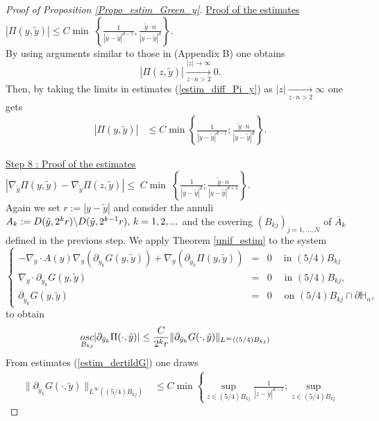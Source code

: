 \documentclass[11pt, reqno]{amsart}
\theoremstyle{definition}
\theoremstyle{remark}
\numberwithin{equation}{section}
\newcommand{\bs}{\symbol{92}}
\begin{document}
\begin{appendices}
\begin{proof}[Proof of \textup{Proposition \ref{Propo_estim_Green_y}}]
		\noindent \underline{Proof of the estimates} \,  $ | \Pi(y,\tilde{y})| \leq C \min \;\left\{\frac{1 }{|y-\tilde{y}|^{d-1}}  ,\frac{\tilde{y}\cdot n }{|y-\tilde{y}|^{d}}   \right\} .$\\
By using arguments similar to those in  \cite{HigPrZhuge} (Appendix B) one obtains 
	$$ |\Pi(z,\tilde{y})|\xrightarrow[z\cdot n>2]{|z|\rightarrow\infty}0.$$ 
Then, by taking the limits in estimates (\ref{estim_diff_Pi_y}) as $|z|\xrightarrow[z\cdot n>2]{}\infty$ one gets
		\begin{align*}
			| \Pi(y,\tilde{y}) | 
			&\leq  C 	\min \left\{  \frac{1 }{ |y-\tilde{y}|^{d-1}  };	\frac{\tilde{y}\cdot n}{|y-\tilde{y}|^{d}  }\right\}.
		\end{align*}
		
		
		\noindent \underline{Step 8 : Proof of the estimates} \,  $	|\nabla_{\tilde{y}} \Pi(y,\tilde{y}) - \nabla_{\tilde{y}} \Pi(z,\tilde{y})|\leq \;C \min \;\left\{\frac{ 1}{|y-\tilde{y}|^{d}}; \frac{\tilde{y}\cdot n }{|y-\tilde{y}|^{d+1}}   \right\} .$\\	
		Again we set $r:=|y-\tilde{y}|$ and consider the annuli $A_k:=D(\tilde{y}, 2^kr)\bs D(\tilde{y},2^{k-1}r),\, k=1,2, ...$ 
		and the covering $(B_{kj})_{j=1,...,N}$ of $\overline{A}_k$ defined in the previous step. We apply Theorem \ref{unif_estim} to the system  
		\begin{equation}
			\left\{
			\begin{array}{rcll}
				-\nabla_y\cdot A(y) \nabla_y ( \partial_{\tilde{y}_k}G(y,\tilde{y}) )  +  \nabla_y  ( \partial_{\tilde{y}_k} \Pi(y,\tilde{y}) ) &=& 0 \   \quad \mbox{in }  (5/4) B_{kj}\\
				\nabla_y\cdot  \partial_{\tilde{y}_k}G(y,\tilde{y})&=& 0 \;   \quad  \mbox{in }  (5/4) B_{kj} ,\\
				\partial_{\tilde{y}_k}G(y,\tilde{y}) &=& 0 \; \quad  \mbox{on }  (5/4)	B_{kj}\cap \partial\mathbb{H}_n,
			\end{array}
			\right. 
		\end{equation}
		to obtain 
		\begin{align}
			\underset{B_{kj}}{\textup{osc}}	| \partial_{\tilde{y}_k} \Pi(\cdot,\tilde{y})|
			&\leq  \frac{C}{2^kr}  \|\partial_{\tilde{y}_k}G(\cdot,\tilde{y})\|_{L^{\infty}((5/4)B_{kj})}\label{estim_Linf_Bkj_der_Pi}
		\end{align}
		From estimates  (\ref{estim_dertildG}) one draws
		\begin{align*}
			\| \partial_{\tilde{y}_k} G(\cdot ,\tilde{y})\|_{L^{\infty}(  (5/4)B_{kj})} 
			&	\leq C \min \left\{ \sup_{z\in{ (5/4) B_{kj}}}  \frac{1 }{|z-\tilde{y}|^{d-1}}; \sup_{z\in{ (5/4)B_{kj}}} 

\end{align*}
\end{proof}
\end{appendices}
\end{document}
